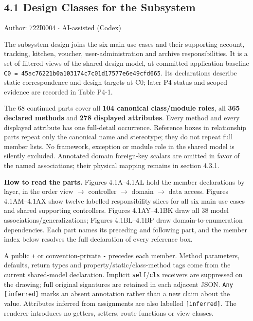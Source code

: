 \subsection*{4.1 Design Classes for the Subsystem}
Author: 722I0004 \ensuremath{\cdot} AI-assisted (Codex)

The subsystem design joins the six main use cases and their supporting account, tracking, kitchen, voucher, user-administration and archive responsibilities. It is a set of filtered views of the shared design model, at committed application baseline \texttt{C0 = 45ac76221b0a103174c7c01d17577e6e49cfd665}. Its declarations describe static correspondence and design targets at C0; later P4 status and scoped evidence are recorded in Table P4-1.

The 68 continued parts cover all \textbf{104 canonical class/module roles}, all \textbf{365 declared methods} and \textbf{278 displayed attributes}. Every method and every displayed attribute has one full-detail occurrence. Reference boxes in relationship parts repeat only the canonical name and stereotype; they do not repeat full member lists. No framework, exception or module role in the shared model is silently excluded. Annotated domain foreign-key scalars are omitted in favor of the named associations; their physical mapping remains in section 4.3.1.

\textbf{How to read the parts.} Figures 4.1A--4.1AL hold the member declarations by layer, in the order view \ensuremath{\rightarrow} controller \ensuremath{\rightarrow} domain \ensuremath{\rightarrow} data access. Figures 4.1AM--4.1AX show twelve labelled responsibility slices for all six main use cases and shared supporting controllers. Figures 4.1AY--4.1BK draw all 38 model associations/generalizations; Figures 4.1BL--4.1BP draw domain-to-enumeration dependencies. Each part names its preceding and following part, and the member index below resolves the full declaration of every reference box.

A public \texttt{+} or convention-private \texttt{-} precedes each member. Method parameters, defaults, return types and property/static/class-method tags come from the current shared-model declaration. Implicit \texttt{self}/\texttt{cls} receivers are suppressed on the drawing; full original signatures are retained in each adjacent JSON. \texttt{Any [inferred]} marks an absent annotation rather than a new claim about the value. Attributes inferred from assignments are also labelled \texttt{[inferred]}. The renderer introduces no getters, setters, route functions or view classes.

